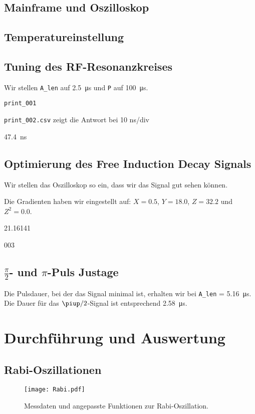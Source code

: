 \section{Mainframe und Oszilloskop}

\section{Temperatureinstellung}
\section{Tuning des RF-Resonanzkreises}

Wir stellen \texttt{A\_len} auf \SI{2.5}{\micro\second} und \texttt P auf
\SI{100}{\micro\second}.

\texttt{print\_001}

\texttt{print\_002.csv} zeigt die Antwort bei 10 ns/div

\SI{47.4}{\nano\second}

\section{Optimierung des Free Induction Decay Signals}

Wir stellen das Oszilloskop so ein, dass wir das Signal gut sehen können.

Die Gradienten haben wir eingestellt auf: $X = 0.5$, $Y = 18.0$, $Z = 32.2$ und
$Z^2 = 0.0$.

21.16141

003

\section{$\frac\pi2$- und $\pi$-Puls Justage}

Die Pulsdauer, bei der das Signal minimal ist, erhalten wir bei \texttt{A\_len}
= \SI{5.16}{\micro\second}. Die Dauer für das $\piup/2$-Signal ist entsprechend
\SI{2.58}{\micro\second}.

\chapter{Durchführung und Auswertung}
\section{Rabi-Oszillationen}

\begin{figure}[htbp]
    \centering
    \texttt{[image: Rabi.pdf]}
    \caption{%
        Messdaten und angepasste Funktionen zur Rabi-Oszillation.
    }
    \label{fig:rabi}
\end{figure}

